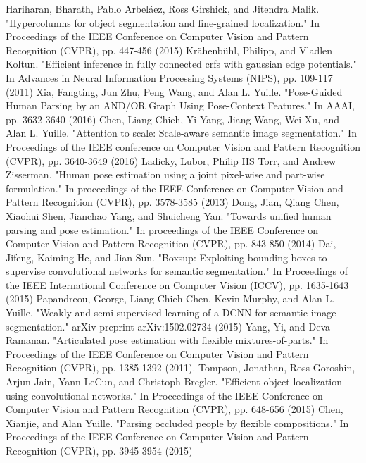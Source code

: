 \begin{thebibliography}{}
Hariharan, Bharath, Pablo Arbeláez, Ross Girshick, and Jitendra Malik. "Hypercolumns for object segmentation and fine-grained localization." In Proceedings of the IEEE Conference on Computer Vision and Pattern Recognition (CVPR), pp. 447-456 (2015)
Krähenbühl, Philipp, and Vladlen Koltun. "Efficient inference in fully connected crfs with gaussian edge potentials." In Advances in Neural Information Processing Systems (NIPS), pp. 109-117 (2011)
Xia, Fangting, Jun Zhu, Peng Wang, and Alan L. Yuille. "Pose-Guided Human Parsing by an AND/OR Graph Using Pose-Context Features." In AAAI, pp. 3632-3640 (2016)
Chen, Liang-Chieh, Yi Yang, Jiang Wang, Wei Xu, and Alan L. Yuille. "Attention to scale: Scale-aware semantic image segmentation." In Proceedings of the IEEE conference on Computer Vision and Pattern Recognition (CVPR), pp. 3640-3649 (2016)
Ladicky, Lubor, Philip HS Torr, and Andrew Zisserman. "Human pose estimation using a joint pixel-wise and part-wise formulation." In proceedings of the IEEE Conference on Computer Vision and Pattern Recognition (CVPR), pp. 3578-3585 (2013)
Dong, Jian, Qiang Chen, Xiaohui Shen, Jianchao Yang, and Shuicheng Yan. "Towards unified human parsing and pose estimation." In proceedings of the IEEE Conference on Computer Vision and Pattern Recognition (CVPR), pp. 843-850 (2014)
%
Dai, Jifeng, Kaiming He, and Jian Sun. "Boxsup: Exploiting bounding boxes to supervise convolutional networks for semantic segmentation." In Proceedings of the IEEE International Conference on Computer Vision (ICCV), pp. 1635-1643 (2015)
Papandreou, George, Liang-Chieh Chen, Kevin Murphy, and Alan L. Yuille. "Weakly-and semi-supervised learning of a DCNN for semantic image segmentation." arXiv preprint arXiv:1502.02734 (2015)
%
Yang, Yi, and Deva Ramanan. "Articulated pose estimation with flexible mixtures-of-parts." In Proceedings of the IEEE Conference on Computer Vision and Pattern Recognition (CVPR), pp. 1385-1392 (2011).
Tompson, Jonathan, Ross Goroshin, Arjun Jain, Yann LeCun, and Christoph Bregler. "Efficient object localization using convolutional networks." In Proceedings of the IEEE Conference on Computer Vision and Pattern Recognition (CVPR), pp. 648-656 (2015)
Chen, Xianjie, and Alan Yuille. "Parsing occluded people by flexible compositions." In Proceedings of the IEEE Conference on Computer Vision and Pattern Recognition (CVPR), pp. 3945-3954 (2015)

\end{thebibliography}
